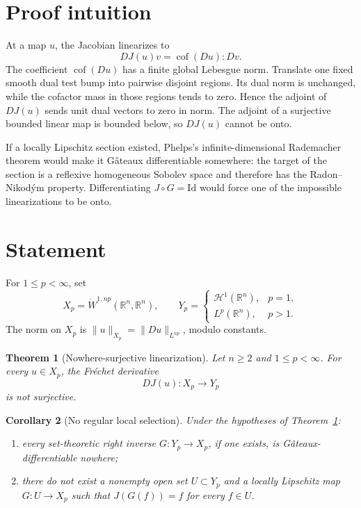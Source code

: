 \documentclass[11pt]{article}
\newtheorem{theorem}{Theorem}
\newtheorem{corollary}[theorem]{Corollary}
\theoremstyle{remark}
\newcommand{\R}{\mathbb R}
\newcommand{\norm}[1]{\lVert #1\rVert}
\newcommand{\cof}{\operatorname{cof}}
\begin{document}
\section{Proof intuition}

At a map $u$, the Jacobian linearizes to
\[
 DJ(u)v=\cof(Du):Dv.
\]
The coefficient $\cof(Du)$ has a finite global Lebesgue norm.  Translate one
fixed smooth dual test bump into pairwise disjoint regions.  Its dual norm is
unchanged, while the cofactor mass in those regions tends to zero.  Hence the
adjoint of $DJ(u)$ sends unit dual vectors to zero in norm.  The adjoint of a
surjective bounded linear map is bounded below, so $DJ(u)$ cannot be onto.

If a locally Lipschitz section existed, Phelps's infinite-dimensional
Rademacher theorem would make it G\^ateaux differentiable somewhere: the
target of the section is a reflexive homogeneous Sobolev space and therefore
has the Radon--Nikod\'ym property.  Differentiating $J\circ G=\mathrm{Id}$
would force one of the impossible linearizations to be onto.

\section{Statement}

For $1\le p<\infty$, set
\[
 X_p=\dot W^{1,np}(\R^n,\R^n),\qquad
 Y_p=\begin{cases}\mathcal H^1(\R^n),&p=1,\\
                   L^p(\R^n),&p>1.
      \end{cases}
\]
The norm on $X_p$ is $\norm{u}_{X_p}=\norm{Du}_{L^{np}}$, modulo constants.

\begin{theorem}[Nowhere-surjective linearization]\label{thm:linear}
Let $n\ge2$ and $1\le p<\infty$.  For every $u\in X_p$, the Fr\'echet
derivative
\[
 DJ(u):X_p\longrightarrow Y_p
\]
is not surjective.
\end{theorem}

\begin{corollary}[No regular local selection]\label{cor:selection}
Under the hypotheses of Theorem~\ref{thm:linear}:
\begin{enumerate}
\item every set-theoretic right inverse $G:Y_p\to X_p$, if one exists, is
G\^ateaux-differentiable nowhere;
\item there do not exist a nonempty open set $U\subset Y_p$ and a locally
Lipschitz map $G:U\to X_p$ such that $J(G(f))=f$ for every $f\in U$.
\end{enumerate}
\end{corollary}
\end{document}
